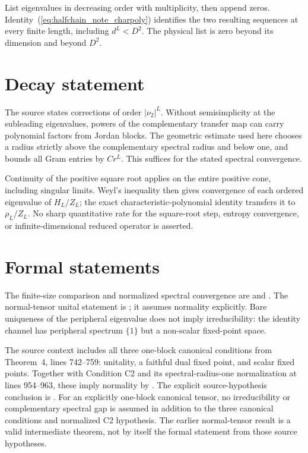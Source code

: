 \documentclass{article}
\begin{document}
List eigenvalues in decreasing order with multiplicity, then append zeros.
Identity~(\ref{eq:halfchain_note_charpoly}) identifies the two resulting
sequences at every finite length, including $d^L<D^2$. The physical list
is zero beyond its dimension and beyond $D^2$.

\section{Decay statement}
The source states corrections of order $|\nu_2|^L$. Without semisimplicity
at the subleading eigenvalues, powers of the complementary transfer map
can carry polynomial factors from Jordan blocks. The geometric estimate
used here chooses a radius strictly above the complementary spectral
radius and below one, and bounds all Gram entries by $Cr^L$.
This suffices for the stated spectral convergence.

Continuity of the positive square root applies on the entire positive
cone, including singular limits. Weyl's inequality then gives convergence
of each ordered eigenvalue of $H_L/Z_L$; the exact characteristic-polynomial
identity transfers it to $\rho_L/Z_L$. No sharp quantitative rate for the
square-root step, entropy convergence, or infinite-dimensional reduced
operator is asserted.

\section{Formal statements}
The finite-size comparison and normalized spectral convergence are
 and
.
The normal-tensor unital statement is
; it assumes
normality explicitly. Bare uniqueness of the peripheral eigenvalue does
not imply irreducibility: the identity channel has peripheral spectrum
$\{1\}$ but a non-scalar fixed-point space.

The source context includes all three one-block canonical conditions from
Theorem~4, lines 742--759: unitality, a faithful dual fixed point, and
scalar fixed points. Together with Condition C2 and its spectral-radius-one
normalization at lines 954--963, these imply normality by
.
The explicit source-hypothesis conclusion is
.
For an explicitly one-block canonical tensor, no irreducibility or
complementary spectral gap is assumed in addition to the three canonical
conditions and normalized C2 hypothesis.
The earlier normal-tensor result is a valid intermediate theorem, not by
itself the formal statement from those source hypotheses.
\end{document}
